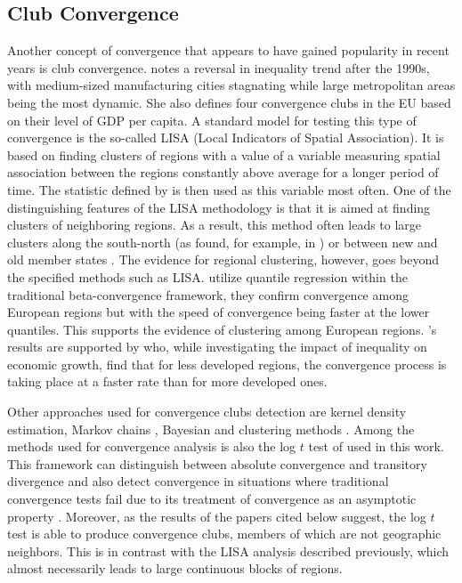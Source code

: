 \documentclass[11pt]{article}
\begin{document}
\subsection{Club Convergence} 
 Another concept of convergence that appears to have gained popularity in recent years is club convergence. \citet{iammarino2017regional} notes a reversal in inequality trend after the 1990s, with medium-sized manufacturing cities stagnating while large metropolitan areas being the most dynamic. She also defines four convergence clubs in the EU based on their level of GDP per capita.
 A standard model for testing this type of convergence is the so-called LISA (Local Indicators of Spatial Association). It is based on finding clusters of regions with a value of a variable measuring spatial association between the regions constantly above average for a longer period of time. The statistic defined by \citet{getis1992analysis} is then used as this variable most often. One of the distinguishing features of the LISA methodology is that it is aimed at finding clusters of neighboring regions. As a result, this method often leads to large clusters along the south-north  (as found, for example, in \citet{baumont2003spatial}) or between new and old member states \citep{eckey2007convergence}. The evidence for regional clustering, however, goes beyond the specified methods such as LISA. \citet{cartone2021does} utilize quantile regression within the traditional beta-convergence framework, they confirm convergence among European regions but with the speed of convergence being faster at the lower quantiles. This supports the evidence of clustering among European regions. \citeauthor{cartone2021does}'s results are supported by \citet{panzera2022impact} who, while investigating the impact of inequality on economic growth, find that for less developed regions, the convergence process is taking place at a faster rate than for more developed ones.
 
Other approaches used for convergence clubs detection are kernel density estimation, Markov chains \citep{eckey2007convergence}, Bayesian \citep{fischer2015bayesian} and clustering methods \citep{maasoumi2008economic}. 
Among the methods used for convergence analysis is also the log $t$ test of \citet{phillips2007transition} used in this work. This framework can distinguish between absolute convergence and transitory divergence and also detect convergence in situations where traditional convergence tests fail due to its treatment of convergence as an asymptotic property \citep{bartkowska2012regional, borsi2015evolution}.
Moreover, as the results of the papers cited below suggest, the log $t$ test is able to produce convergence clubs, members of which are not geographic neighbors. This is in contrast with the LISA analysis described previously, which almost necessarily leads to large continuous blocks of regions.
\end{document}
